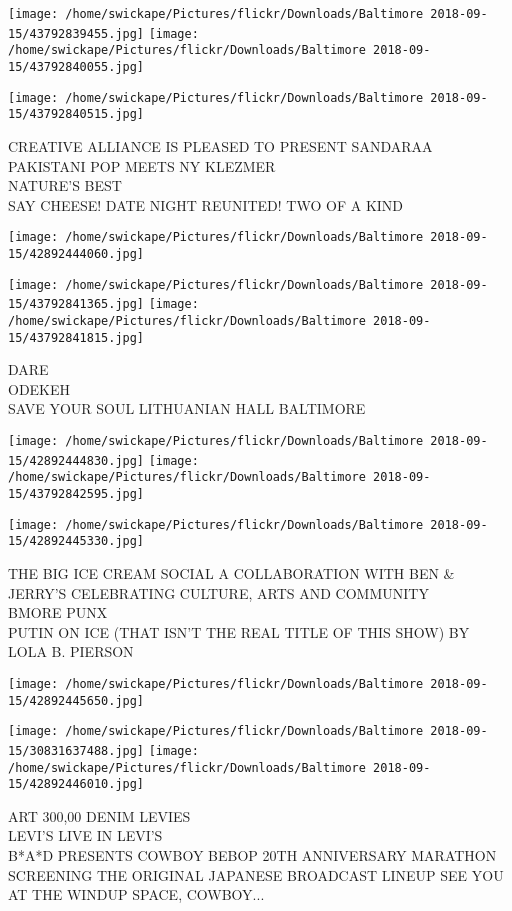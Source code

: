 \documentclass[10pt,letterpaper]{article}
\begin{document}
\texttt{[image: /home/swickape/Pictures/flickr/Downloads/Baltimore 2018-09-15/43792839455.jpg]}
\texttt{[image: /home/swickape/Pictures/flickr/Downloads/Baltimore 2018-09-15/43792840055.jpg]}

\texttt{[image: /home/swickape/Pictures/flickr/Downloads/Baltimore 2018-09-15/43792840515.jpg]}

CREATIVE ALLIANCE IS PLEASED TO PRESENT SANDARAA PAKISTANI POP MEETS NY KLEZMER\\
NATURE'S BEST\\
SAY CHEESE!  DATE NIGHT  REUNITED!  TWO OF A KIND
\pagebreak

\texttt{[image: /home/swickape/Pictures/flickr/Downloads/Baltimore 2018-09-15/42892444060.jpg]}

\vspace{0.25in}
\texttt{[image: /home/swickape/Pictures/flickr/Downloads/Baltimore 2018-09-15/43792841365.jpg]}
\texttt{[image: /home/swickape/Pictures/flickr/Downloads/Baltimore 2018-09-15/43792841815.jpg]}

DARE\\
ODEKEH\\
SAVE YOUR SOUL LITHUANIAN HALL BALTIMORE
\pagebreak

\texttt{[image: /home/swickape/Pictures/flickr/Downloads/Baltimore 2018-09-15/42892444830.jpg]}
\texttt{[image: /home/swickape/Pictures/flickr/Downloads/Baltimore 2018-09-15/43792842595.jpg]}

\texttt{[image: /home/swickape/Pictures/flickr/Downloads/Baltimore 2018-09-15/42892445330.jpg]}

THE BIG ICE CREAM SOCIAL A COLLABORATION WITH BEN \& JERRY'S CELEBRATING CULTURE, ARTS AND COMMUNITY\\
BMORE PUNX\\
PUTIN ON ICE (THAT ISN'T THE REAL TITLE OF THIS SHOW) BY LOLA B. PIERSON
\pagebreak

\texttt{[image: /home/swickape/Pictures/flickr/Downloads/Baltimore 2018-09-15/42892445650.jpg]}

\vspace{0.25in}
\texttt{[image: /home/swickape/Pictures/flickr/Downloads/Baltimore 2018-09-15/30831637488.jpg]}
\texttt{[image: /home/swickape/Pictures/flickr/Downloads/Baltimore 2018-09-15/42892446010.jpg]}

ART 300,00 DENIM LEVIES\\
LEVI'S LIVE IN LEVI'S\\
B*A*D PRESENTS COWBOY BEBOP 20TH ANNIVERSARY MARATHON SCREENING THE ORIGINAL JAPANESE BROADCAST LINEUP SEE YOU AT THE WINDUP SPACE, COWBOY...
\pagebreak
\end{document}
